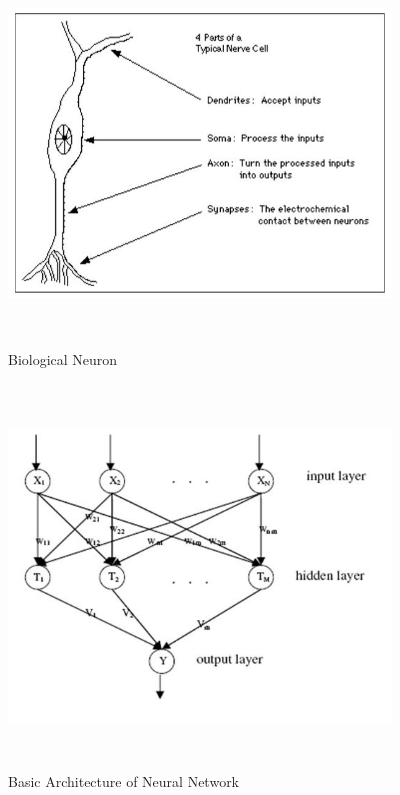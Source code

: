 \documentclass[a4paper,14pt,onecolumn]{article}
\begin{document}
\begin{figure}[hbp]
\begin{center}
\includegraphics[height=4in,width=4in]
{Neuron.jpg}  
\caption{Biological Neuron}
\end{center}
\end{figure}  

\begin{figure}[hbp]
\begin{center}
\includegraphics[height=4in,width=4in]
{Neuralnetwork.jpg}  
\caption{Basic Architecture of Neural Network}
\end{center}
\end{figure} 
\end{document}
